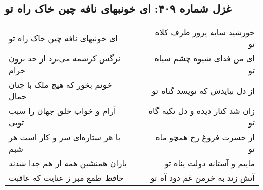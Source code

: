\begin{center}
\section*{غزل شماره ۴۰۹: ای خونبهای نافه چین خاک راه تو}
\label{sec:sh409}
\begin{longtable}{l p{0.5cm} r}
ای خونبهای نافه چین خاک راه تو
&&
خورشید سایه پرور طرف کلاه تو
\\
نرگس کرشمه می‌برد از حد برون خرام
&&
ای من فدای شیوه چشم سیاه تو
\\
خونم بخور که هیچ ملک با چنان جمال
&&
از دل نیایدش که نویسد گناه تو
\\
آرام و خواب خلق جهان را سبب تویی
&&
زان شد کنار دیده و دل تکیه گاه تو
\\
با هر ستاره‌ای سر و کار است هر شبم
&&
از حسرت فروغ رخ همچو ماه تو
\\
یاران همنشین همه از هم جدا شدند
&&
ماییم و آستانه دولت پناه تو
\\
حافظ طمع مبر ز عنایت که عاقبت
&&
آتش زند به خرمن غم دود آه تو
\\
\end{longtable}
\end{center}
